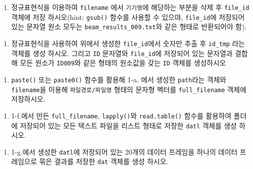 \documentclass[
  11pt,
]{krantz}
\providecommand{\tightlist}{%
  \setlength{\itemsep}{0pt}\setlength{\parskip}{0pt}}
\begin{document}
\footnotesize

\normalsize

\begin{enumerate}
\def\labelenumi{\alph{enumi}.}
\setcounter{enumi}{3}
\tightlist
\item
  정규표현식을 이용하여 \texttt{filename} 에서 \texttt{기기명}에 해당하는 부분을 삭제 후 \texttt{file\_id} 객체에 저장 하시오(hint: \texttt{gsub()} 함수를 사용할 수 있으먀, \texttt{file\_id}에 저장되어 있는 문자열 원소 모두는 \texttt{beam\_results\_009.txt}와 같은 형태로 반환되어야 함).
\end{enumerate}

\footnotesize

\normalsize

\begin{enumerate}
\def\labelenumi{\alph{enumi}.}
\setcounter{enumi}{4}
\tightlist
\item
  정규표현식을 사용하여 위에서 생성한 \texttt{file\_id}에서 숫자만 추출 후 \texttt{id\_tmp} 라는 객체를 생성 하시오. 그리고 \texttt{ID} 문자열와 \texttt{file\_id}에 저장되어 있는 문자열과 결합해 모든 원소가 \texttt{ID009}와 같은 형태의 원소값을 갖는 \texttt{ID} 객체를 생성하시오
\end{enumerate}

\footnotesize

\normalsize

\begin{enumerate}
\def\labelenumi{\alph{enumi}.}
\setcounter{enumi}{5}
\tightlist
\item
  \texttt{paste()} 또는 \texttt{paste0()} 함수를 활용해 1-a. 에서 생성한 \texttt{path}라는 객체와 \texttt{filename}을 이용해 \texttt{파일경로/파일명} 형태의 문자형 벡터를 \texttt{full\_filename} 객체에 저장하시오.
\end{enumerate}

\footnotesize

\normalsize

\begin{enumerate}
\def\labelenumi{\alph{enumi}.}
\setcounter{enumi}{6}
\tightlist
\item
  1-f.에서 만든 \texttt{full\_filename}, \texttt{lapply()}와 \texttt{read.table()} 함수를 활용하여 폴더에 저장되어 있는 모든 텍스트 파일을 리스트 형태로 저장한 \texttt{datl} 객체를 생성 하시오.
\end{enumerate}

\footnotesize

\normalsize

\begin{enumerate}
\def\labelenumi{\alph{enumi}.}
\setcounter{enumi}{7}
\tightlist
\item
  1-g.에서 생성한 \texttt{datl}에 저장되어 있는 20개의 데이터 프레임을 하나의 데이터 프레임으로 묶은 결과를 저장한 \texttt{dat} 객체를 생성 하시오.
\end{enumerate}
\end{document}
